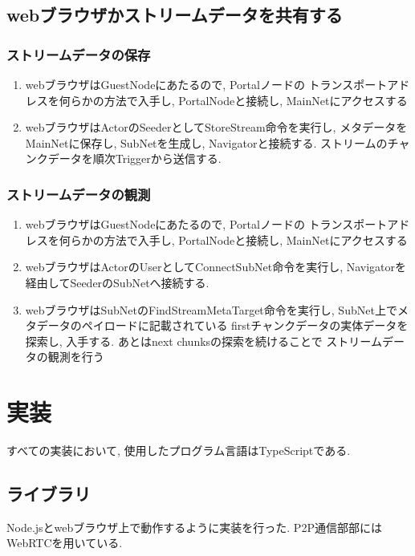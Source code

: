 \documentclass[sotsuron]{jcsie}
\begin{document}
\subsection{webブラウザかストリームデータを共有する}
\subsubsection{ストリームデータの保存}
\begin{enumerate}
	\item 
	      webブラウザはGuestNodeにあたるので, Portalノードの
	      トランスポートアドレスを何らかの方法で入手し, PortalNodeと接続し, 
	      MainNetにアクセスする
	      \\
	\item
	      webブラウザはActorのSeederとしてStoreStream命令を実行し, 
	      メタデータをMainNetに保存し, SubNetを生成し, Navigatorと接続する.
	      ストリームのチャンクデータを順次Triggerから送信する.	
\end{enumerate}
\subsubsection{ストリームデータの観測}
\begin{enumerate}
	\item 
	      webブラウザはGuestNodeにあたるので, Portalノードの
	      トランスポートアドレスを何らかの方法で入手し, PortalNodeと接続し, 
	      MainNetにアクセスする
	      \\
	\item
	      webブラウザはActorのUserとしてConnectSubNet命令を実行し, 
	      Navigatorを経由してSeederのSubNetへ接続する.
	      \\
	\item 
	      webブラウザはSubNetのFindStreamMetaTarget命令を実行し, 
	      SubNet上でメタデータのペイロードに記載されている
	      firstチャンクデータの実体データを探索し, 入手する.
	      あとはnext chunksの探索を続けることで
	      ストリームデータの観測を行う
\end{enumerate}

\newpage

\section{実装}
すべての実装において, 使用したプログラム言語はTypeScriptである.

\subsection{ライブラリ}
Node.jsとwebブラウザ上で動作するように実装を行った.
P2P通信部部にはWebRTCを用いている.
\end{document}

